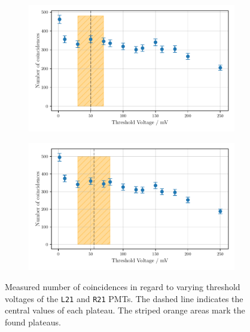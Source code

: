 \begin{figure}
    \centering
    \begin{subfigure}[b]{0.48\textwidth}
        \includegraphics[width=\textwidth]{plots/threshL21.pdf}
    \end{subfigure}\hfill
    \begin{subfigure}[b]{0.48\textwidth}
        \includegraphics[width=\textwidth]{plots/threshR21.pdf}
    \end{subfigure}
    \caption{Measured number of coincidences in regard to varying threshold voltages
    of the \texttt{L21} and \texttt{R21} PMTs.
    The dashed line indicates the central values of each plateau. The striped orange areas mark the found plateaus.}
    \label{fig:appthresh6}
\end{figure}
